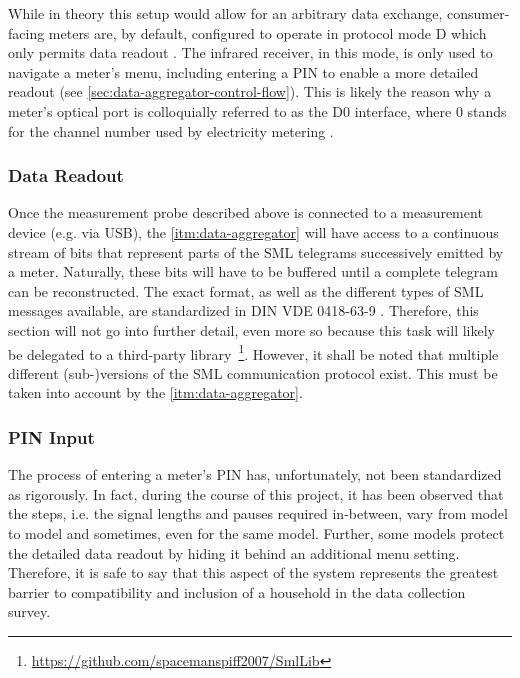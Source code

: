 While in theory this setup would allow for an arbitrary data exchange, consumer-facing meters are, by default, configured to operate in protocol mode D which only permits data readout \cite[p.~7]{nzr2011ehz} \cite[p.~35]{iec2002d0}. The infrared receiver, in this mode, is only used to navigate a meter's menu, including entering a \acs{PIN} to enable a more detailed readout (see \autoref{sec:data-aggregator-control-flow}). This is likely the reason why a meter's optical port is colloquially referred to as the D0 interface, where 0 stands for the channel number used by electricity metering \cite[p.~119]{iec2002d0}.


\subsubsection{Data Readout}
\label{sec:meter-data-readout}

Once the measurement probe described above is connected to a measurement device (e.g. via USB), the \ref{itm:data-aggregator} will have access to a continuous stream of bits that represent parts of the \acs{SML} telegrams successively emitted by a meter. Naturally, these bits will have to be buffered until a complete telegram can be reconstructed. The exact format, as well as the different types of \acs{SML} messages available, are standardized in \acs{DIN} \acs{VDE} 0418-63-9 \cite{vde2018sml}. Therefore, this section will not go into further detail, even more so because this task will likely be delegated to a third-party library~\footnote{\url{https://github.com/spacemanspiff2007/SmlLib}}. However, it shall be noted that multiple different (sub-)versions of the \acs{SML} communication protocol exist. This must be taken into account by the \ref{itm:data-aggregator}.


\subsubsection{\acs{PIN} Input}
\label{sec:meter-pin-input}

The process of entering a meter's \acs{PIN} has, unfortunately, not been standardized as rigorously. In fact, during the course of this project, it has been observed that the steps, i.e. the signal lengths and pauses required in-between, vary from model to model and sometimes, even for the same model. Further, some models protect the detailed data readout by hiding it behind an additional menu setting. Therefore, it is safe to say that this aspect of the system represents the greatest barrier to compatibility and inclusion of a household in the data collection survey.

